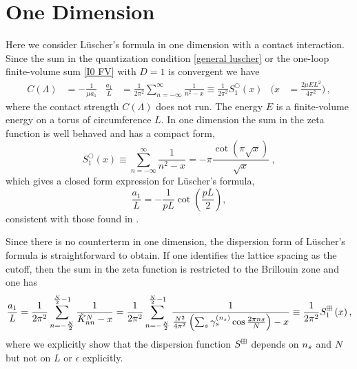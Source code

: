 \section{One Dimension}\label{sec:1D}

Here we consider L\"uscher's formula in one dimension with a contact interaction.
Since the sum in the quantization condition \eqref{general luscher} or the one-loop finite-volume sum \eqref{I0 FV} with $D=1$ is convergent we have %
\begin{align}\label{eq:tuning-1d}
    C(\Lambda)
    &=
            -\frac{1}{\mu a_{1}}
    &
    \frac{a_{1}}{L}
        &=
            \frac{1}{2 \pi^{2}}
            \sum_{n=-\infty}^{\infty} \frac{1}{n^{2}-x}
        \equiv
            \frac{1}{2 \pi^{2}}
            S^\bigcirc_{1}\left(x\right)
    &
    \Bigg(x
        &=
            \frac{2\mu E L^2}{4\pi^2}\Bigg)
    \, ,
\end{align}
where the contact strength $C(\Lambda)$ does not run.
The energy $E$ is a finite-volume energy on a torus of circumference $L$.
In one dimension the sum in the zeta function is well behaved and has a compact form,
\begin{equation}\label{eq:1d luscher}
S^\bigcirc_{1}(x) \equiv \sum_{n=-\infty}^{\infty} \frac{1}{n^{2}-x}=-\pi \frac{\cot (\pi \sqrt{x})}{\sqrt{x}}\ ,
\end{equation}
which gives a closed form expression for L\"uscher's formula,
\begin{equation}\label{eq:1d luscher constant}
\frac{a_{1}}{L} =-\frac{1}{pL}\cot\left(\frac{pL}{2}\right),
\end{equation}
consistent with those found in .

Since there is no counterterm in one dimension, the dispersion form of L\"uscher's formula is straightforward to obtain.  If one identifies the lattice spacing as the cutoff, then the sum in the zeta function is restricted to the Brillouin zone and one has
\begin{equation}
    \frac{a_{1}}{L}
    =
    \frac{1}{2 \pi^{2}} \sum_{n=-\frac{N}{2}}^{\frac{N}{2}-1} \frac{1}{\tilde{K}^N_{nn}-x}
    =
    \frac{1}{2 \pi^{2}} \sum_{n=-\frac{N}{2}}^{\frac{N}{2}-1} \frac{1}{\frac{N^2}{4\pi^2}\left(\sum_{s}\gamma_s^{({n_s})}\cos\frac{2\pi n s}{N}\right)-x}
    \equiv
    \frac{1}{2 \pi^{2}} S^{\boxplus}_{1}\left(x\right),\label{eq:1d dispersion luscher}
\end{equation}
where we explicitly show that the dispersion function $S^{\boxplus}$ depends on ${n_s}$ and $N$ but not on $L$ or $\epsilon$ explicitly.

